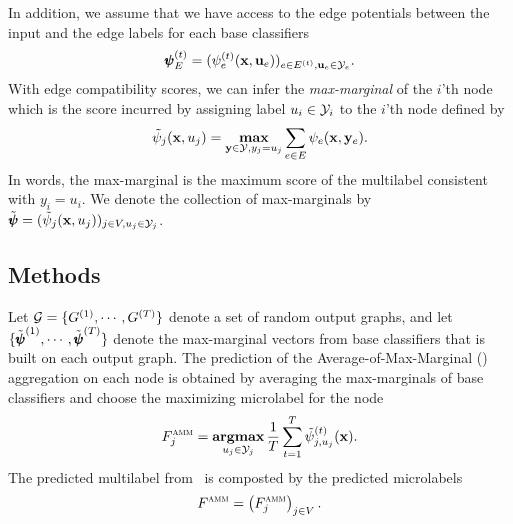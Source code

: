 {%
In addition, we assume that we have access to the edge potentials between the input and the edge labels for each base classifiers
\begin{align*}
	\pmb \psi_E^{(t)} = (\psi_e^{(t)}(\mathbf {x},\mathbf {u}_e))_{e\in E^{(t)},\mathbf {u}_e\in\mathcal{Y}_e}.
\end{align*}
With edge compatibility scores, we can infer the \textit{max-marginal} of the $i$'th node which is the score incurred by assigning label $u_i\in\mathcal{Y}_i$ to the $i$'th node \citep{Wainwright05map} defined by
\begin{align*}
	\tilde{\psi}_j(\mathbf {x},u_j) = \underset{\mathbf {y}\in\mathcal{Y},y_j=u_j}{\textbf{max}}\sum_{e\in E}\psi_e(\mathbf {x},\mathbf {y}_e).
\end{align*}
In words, the max-marginal is the maximum score of the multilabel consistent with $y_i=u_i$.
We denote the collection of max-marginals by $\tilde{\pmb \psi} = (\tilde{\psi}_j(\mathbf {x},u_j))_{j\in V,u_j\in\mathcal{Y}_j}$.

\subsection{Methods}

Let $\mathcal{G}=\{G^{(1)},\cdots,G^{(T)}\}$ denote a set of random output graphs, and let $\{\tilde{\pmb \psi}^{(1)},\cdots,\tilde{\pmb \psi}^{(T)}\}$ denote the max-marginal vectors from base classifiers that is built on each output graph.
The prediction of the Average-of-Max-Marginal (\amm) aggregation on each node is obtained by averaging the max-marginals of base classifiers and choose the maximizing microlabel for the node
\begin{align*}
	F_j^{\text{{\sc amm}}}=\underset{u_j\in\mathcal{Y}_j}{\textbf{argmax}}\,\frac{1}{T}\sum_{t=1}^{T}\tilde{\psi}_{j,u_j}^{(t)}(\mathbf {x}).	\end{align*}
The predicted multilabel from \amm\ is composted by the predicted microlabels
\begin{align*}
	F^{\text{{\sc amm}}}=\left(F_j^{\text{{\sc amm}}}\right)_{j\in V}.
\end{align*}

}
